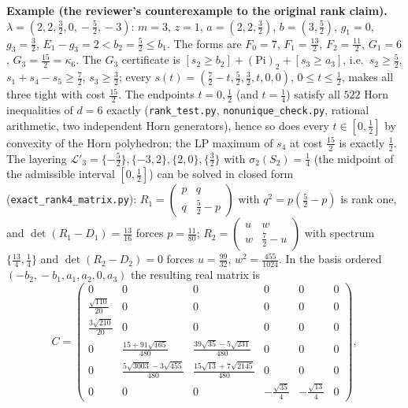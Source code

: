 \documentclass[
  11pt,
  a4paper,
]{article}
\begin{document}
\textbf{Example (the reviewer's counterexample to the original rank
claim).} \(\lambda=(2,\allowbreak{}2,\allowbreak{}\tfrac32,\allowbreak{}0,\allowbreak{}-\tfrac52,\allowbreak{}-3)\): \(m=3\), \(z=1\),
\(a=(2,\allowbreak{}2,\allowbreak{}\tfrac32)\), \(b=(3,\allowbreak{}\tfrac52)\), \(g_1=0\), \(g_3=\tfrac32\),
\(E_1-g_3=2<b_2=\tfrac52\le b_1\). The forms are \(F_0=7\),
\(F_1=\tfrac{13}2\), \(F_2=\tfrac{11}2\), \(G_1=6\),
\(G_3=\tfrac{15}2=\kappa_6\). The \(G_3\) certificate is
\([s_2\ge b_2]+(\mathrm{Pi})_2+[s_3\ge a_3]\), i.e.~\(s_2\ge\tfrac52\),
\(s_1+s_4-s_5\ge\tfrac72\), \(s_3\ge\tfrac32\); every
\(s(t)=(\tfrac72-t,\allowbreak{}\tfrac52,\allowbreak{}\tfrac32,\allowbreak{}t,\allowbreak{}0,\allowbreak{}0)\), \(0\le t\le\tfrac12\),
makes all three tight with cost \(\tfrac{15}2\). The endpoints
\(t=0,\allowbreak{}\tfrac12\) (and \(t=\tfrac14\)) satisfy all \(522\) Horn
inequalities of \(d=6\) exactly ({\small\texttt{rank\_\allowbreak{}test.\allowbreak{}py}},
{\small\texttt{nonunique\_\allowbreak{}check.\allowbreak{}py}}, rational arithmetic, two independent Horn
generators), hence so does every \(t\in[0,\allowbreak{}\tfrac12]\) by convexity of
the Horn polyhedron; the LP maximum of \(s_4\) at cost \(\tfrac{15}2\)
is exactly \(\tfrac12\). The layering
\(\mathcal L'_3=\{-\tfrac52\},\allowbreak{}\{-3,\allowbreak{}2\},\allowbreak{}\{2,\allowbreak{}0\},\allowbreak{}\{\tfrac32\}\) with
\(\sigma_2(S_2)=\tfrac14\) (the midpoint of the admissible interval
\([0,\allowbreak{}\tfrac12]\)) can be solved in closed form
({\small\texttt{exact\_\allowbreak{}rank4\_\allowbreak{}matrix.\allowbreak{}py}}):
\(R_1=\begin{pmatrix}p&q\\ q&\frac52-p\end{pmatrix}\) with
\(q^2=p(\frac52-p)\) is rank one, and \(\det(R_1-D_1)=\frac{13}{16}\)
forces \(p=\frac{11}{80}\);
\(R_2=\begin{pmatrix}u&w\\ w&\frac72-u\end{pmatrix}\) with spectrum
\(\{\frac{13}4,\allowbreak{}\frac14\}\) and \(\det(R_2-D_2)=0\) forces
\(u=\frac{99}{32}\), \(w^2=\frac{455}{1024}\). In the basis ordered
\((-b_2,\allowbreak{}-b_1,\allowbreak{}a_1,\allowbreak{}a_2,\allowbreak{}0,\allowbreak{}a_3)\) the resulting real matrix is
\[C=\begin{pmatrix}0&0&0&0&0&0\\[2pt] \frac{\sqrt{110}}{20}&0&0&0&0&0\\[2pt] \frac{3\sqrt{210}}{20}&0&0&0&0&0\\[2pt] 0&\frac{15+91\sqrt{165}}{480}&\frac{39\sqrt{35}-5\sqrt{231}}{480}&0&0&0\\[2pt] 0&\frac{5\sqrt{3003}-3\sqrt{455}}{480}&\frac{15\sqrt{13}+7\sqrt{2145}}{480}&0&0&0\\[2pt] 0&0&0&-\frac{\sqrt{35}}{4}&-\frac{\sqrt{13}}{4}&0\end{pmatrix},\]
\end{document}
